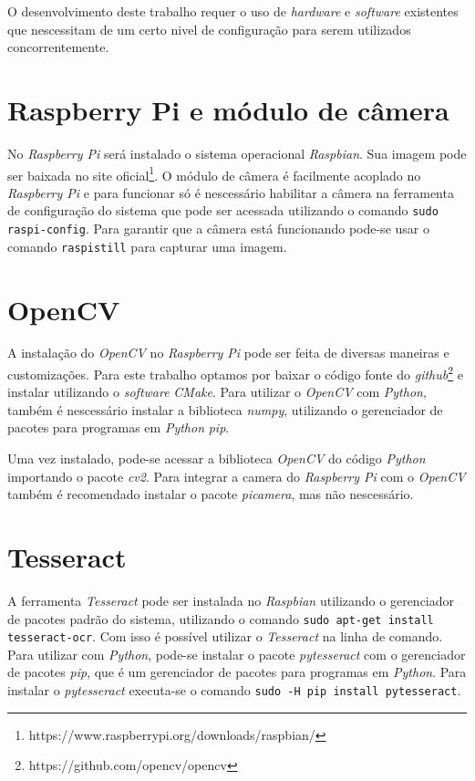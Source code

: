 O desenvolvimento deste trabalho requer o uso de \emph{hardware} e
\emph{software} existentes que nescessitam de um certo nivel de configuração
para serem utilizados concorrentemente.

\section{Raspberry Pi e módulo de câmera}
\label{sec:confrpi}

No \emph{Raspberry Pi} será instalado o sistema operacional \emph{Raspbian}. Sua
imagem pode ser baixada no site
oficial\footnote{https://www.raspberrypi.org/downloads/raspbian/}. O módulo de
câmera é facilmente acoplado no \emph{Raspberry Pi} e para funcionar só é
nescessário habilitar a câmera na ferramenta de configuração do sistema que pode
ser acessada utilizando o comando \texttt{sudo raspi-config}. Para garantir que
a câmera está funcionando pode-se usar o comando \texttt{raspistill} para
capturar uma imagem.

\section{OpenCV}
\label{sec:confopencv}

A instalação do \emph{OpenCV} no \emph{Raspberry Pi} pode ser feita de diversas
maneiras e customizações.  Para este trabalho optamos por baixar o código fonte
do \emph{github}\footnote{https://github.com/opencv/opencv} e instalar
utilizando o \emph{software} \emph{CMake}. Para utilizar o \emph{OpenCV} com
\emph{Python}, também é nescessário instalar a biblioteca \emph{numpy},
utilizando o gerenciador de pacotes para programas em \emph{Python} \emph{pip}.

Uma vez instalado, pode-se acessar a biblioteca \emph{OpenCV} do código \emph{Python} importando o pacote \emph{cv2}.
Para integrar a camera do \emph{Raspberry Pi} com o \emph{OpenCV} também é recomendado instalar o pacote \emph{picamera},
mas não nescessário.

\section{Tesseract}
\label{sec:conftess}

A ferramenta \emph{Tesseract} pode ser instalada no \emph{Raspbian} utilizando o gerenciador de pacotes padrão do sistema,
utilizando o comando \texttt{sudo apt-get install tesseract-ocr}. Com isso é possível utilizar o \emph{Tesseract} na linha
de comando. Para utilizar com \emph{Python}, pode-se instalar o pacote \emph{pytesseract} com o gerenciador de pacotes \emph{pip},
que é um gerenciador de pacotes para programas em \emph{Python}. Para instalar o \emph{pytesseract} executa-se o comando
\texttt{sudo -H pip install pytesseract}.
